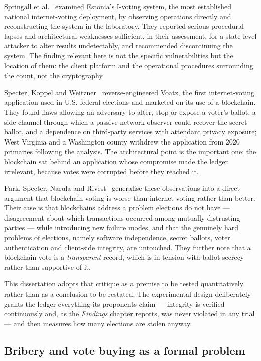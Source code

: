 Springall et al.~\cite{springall2014} examined Estonia's I-voting
system, the most established national internet-voting deployment, by
observing operations directly and reconstructing the system in the
laboratory. They reported serious procedural lapses and architectural
weaknesses sufficient, in their assessment, for a state-level attacker
to alter results undetectably, and recommended discontinuing the
system. The finding relevant here is not the specific vulnerabilities
but the location of them: the client platform and the operational
procedures surrounding the count, not the cryptography.

Specter, Koppel and Weitzner~\cite{specter2020} reverse-engineered
Voatz, the first internet-voting application used in U.S. federal
elections and marketed on its use of a blockchain. They found flaws
allowing an adversary to alter, stop or expose a voter's ballot, a
side-channel through which a passive network observer could recover the
secret ballot, and a dependence on third-party services with attendant
privacy exposure; West Virginia and a Washington county withdrew the
application from 2020 primaries following the analysis. The
architectural point is the important one: the blockchain sat behind an
application whose compromise made the ledger irrelevant, because votes
were corrupted before they reached it.

Park, Specter, Narula and Rivest~\cite{park2021} generalise these
observations into a direct argument that blockchain voting is worse
than internet voting rather than better. Their case is that blockchains
address a problem elections do not have --- disagreement about which
transactions occurred among mutually distrusting parties --- while
introducing new failure modes, and that the genuinely hard problems of
elections, namely software independence, secret ballots, voter
authentication and client-side integrity, are untouched. They further
note that a blockchain vote is a \emph{transparent} record, which is in
tension with ballot secrecy rather than supportive of it.

This dissertation adopts that critique as a premise to be tested
quantitatively rather than as a conclusion to be restated. The
experimental design deliberately grants the ledger everything its
proponents claim --- integrity is verified continuously and, as the \emph{Findings} chapter reports, was never violated in any trial ---
and then measures how many elections are stolen anyway.

\subsection{Bribery and vote buying as a formal problem}
\label{sec:lit-bribery}

